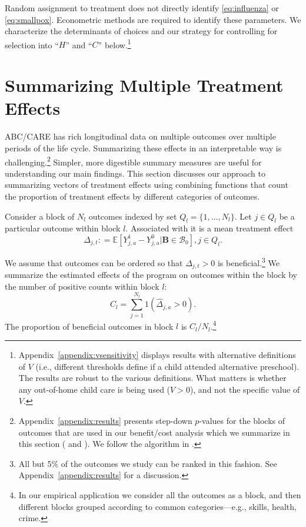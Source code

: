 Random assignment to treatment does not directly identify \eqref{eq:influenza} or \eqref{eq:smallpox}. Econometric methods are required to identify these parameters. We characterize the determinants of choices and our strategy for controlling for selection into ``$H$'' and ``$C$'' below.\footnote{Appendix~\ref{appendix:vsensitivity} displays results with alternative definitions of $V$ (i.e., different thresholds define if a child attended alternative preschool). The results are robust to the various definitions. What matters is whether any out-of-home child care is being used ($V>0$), and not the specific value of $V$.}

\section{Summarizing Multiple Treatment Effects} \label{section:methodology}

ABC/CARE has rich longitudinal data on multiple outcomes over multiple periods of the life cycle. Summarizing these effects in an interpretable way is challenging.\footnote{Appendix~\ref{appendix:results} presents step-down $p$-values for the blocks of outcomes that are used in our benefit/cost analysis which we summarize in this section (\citealp{Lehman_Romano_2005_AnnStat} and \citealp{Romano_Shaikh_2006_AnnStat}). We follow the algorithm in \citet{Romano_Wolf_2016_pval_SaPL}.} Simpler, more digestible summary measures are useful for understanding our main findings. This section discusses our approach to summarizing vectors of treatment effects using combining functions that count the proportion of treatment effects by different categories of outcomes.

Consider a block of $N_l$ outcomes indexed by set $Q_l = \{1,\dots,N_l\}$. Let $j \in Q_l$ be a particular outcome within block $l$. Associated with it is a mean treatment effect
\begin{equation}
\Delta_{j,t} : = \mathbb{E} \left[ Y^1_{j,a} - Y^0_{j,a} | \bm{B} \in \mathcal{B}_0 \right], j \in Q_l.
\end{equation}

We assume that outcomes can be ordered so that $\Delta_{j,t} >0$ is beneficial.\footnote{All but 5\% of the outcomes we study can be ranked in this fashion. See Appendix~\ref{appendix:results} for a discussion.} We summarize the estimated effects of the program on outcomes within the block by the number of positive counts within block $l$:
\begin{equation}
C_l = \sum^{N_l}_{j=1} 1 (\hat{\Delta}_{j,a} >0).
\end{equation}
The proportion of beneficial outcomes in block $l$ is $C_l / N_l$.\footnote{In our empirical application we consider all the outcomes as a block, and then different blocks grouped according to common categories---e.g., skills, health, crime.}

